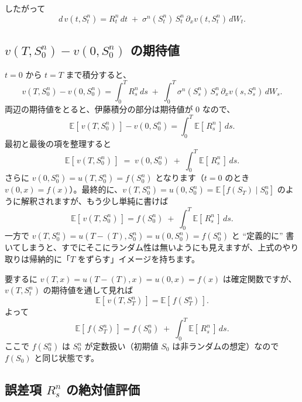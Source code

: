 \documentclass[a4paper]{jsarticle}
\begin{document}
したがって  
\[  
  d\,v(t, S_t^n)  
  =  
  R_t^n\,dt  
  \;+\;  
  \sigma^n(S_t^n)\,S_t^n\,\partial_x v(t,S_t^n)\,dW_t.  
\]  

\subsection{$v(T,S_0^n) - v(0,S_0^n)$ の期待値}  

$t=0$ から $t=T$ まで積分すると、  
\[  
  v(T,S_0^n) - v(0,S_0^n)  
  =  
  \int_0^T R_s^n\,ds  
  \;+\;  
  \int_0^T   
    \sigma^n(S_s^n)\,S_s^n\,\partial_x v(s,S_s^n)\,dW_s.  
\]  
両辺の期待値をとると、伊藤積分の部分は期待値が $0$ なので、  
\[  
  \mathbb{E}[\,v(T,S_0^n)\,] - v(0,S_0^n)  
  =  
  \int_0^T \mathbb{E}[\,R_s^n\,]\,ds.  
\]  
最初と最後の項を整理すると  
\[  
  \mathbb{E}[\,v(T,S_0^n)\,]  
  \;=\;  
  v(0,S_0^n)  
  \;+\;  
  \int_0^T \mathbb{E}[\,R_s^n\,]\,ds.  
\]  
さらに $v(0,S_0^n) = u(T,S_0^n) = f(S_0^n)$ となります（$t=0$ のとき $v(0,x)=f(x)$）。最終的に、$v(T,S_0^n)=u(0,S_0^n)=\mathbb{E}[f(S_T)\mid S_0^n]$ のように解釈されますが、もう少し単純に書けば  
\[  
  \mathbb{E}[\,v(T,S_0^n)\,]  
  =  
  f(S_0^n)  
  \;+\;  
  \int_0^T \mathbb{E}[\,R_s^n\,]\,ds.  
\]  
一方で $v(T,S_0^n) = u(T-(T),S_0^n)=u(0,S_0^n)=f(S_0^n)$ と “定義的に” 書いてしまうと、すでにそこにランダム性は無いようにも見えますが、上式のやり取りは帰納的に「$T$ をずらす」イメージを持ちます。  

要するに $v(T,x)=u(T-(T),x)=u(0,x)=f(x)$ は確定関数ですが、$v(T,S_t^n)$ の期待値を通して見れば  
\[  
  \mathbb{E}[\,v(T,S_T^n) \,]  
  =  
  \mathbb{E}[\,f(S_T^n)\,].  
\]  
よって  
\[  
  \mathbb{E}[\,f(S_T^n)\,]  
  =  
  f(S_0^n)  
  \;+\;  
  \int_0^T \mathbb{E}[\,R_s^n\,]\,ds.  
\]  
ここで $f(S_0^n)$ は $S_0^n$ が定数扱い（初期値 $S_0$ は非ランダムの想定）なので $f(S_0)$ と同じ状態です。  

\subsection{誤差項 $R_s^n$ の絶対値評価}  
\end{document}

